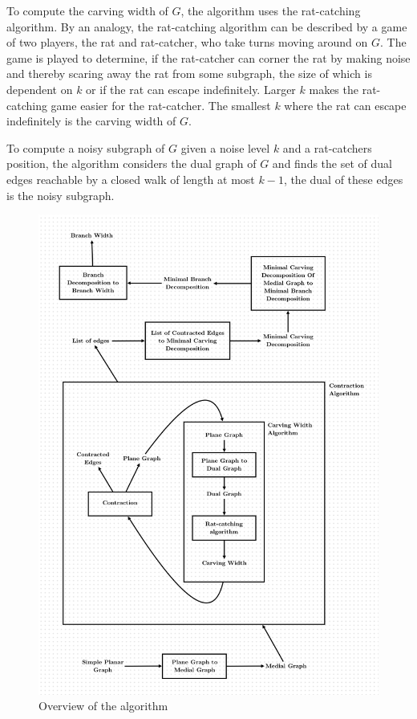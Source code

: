 \documentclass{article}
\begin{document}
	To compute the carving width of $G$, the algorithm uses the rat-catching algorithm. By an analogy, the rat-catching algorithm can be described by a game of two players, the rat and rat-catcher, who take turns moving around on $G$. The game is played to determine, if the rat-catcher can corner the rat by making noise and thereby scaring away the rat from some subgraph, the size of which is dependent on $k$ or if the rat can escape indefinitely. Larger $k$ makes the rat-catching game easier for the rat-catcher. The smallest $k$ where the rat can escape indefinitely is the carving width of $G$.

	To compute a noisy subgraph of $G$ given a noise level $k$ and a rat-catchers position, the algorithm considers the dual graph of $G$ and finds the set of dual edges reachable by a closed walk of length at most $k-1$, the dual of these edges is the noisy subgraph.

	\begin{figure}[H]
		\centering
		\includegraphics[width=\textwidth]{./images/overview.png}
		\caption{Overview of the algorithm}
		\label{fig:overview}
	\end{figure}
\end{document}
